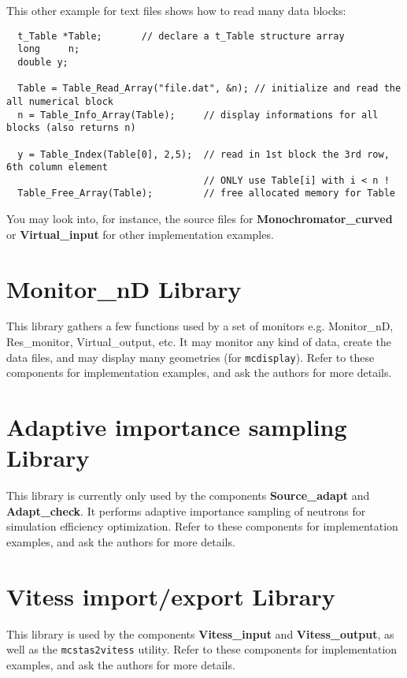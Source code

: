 This other example for text files shows how to read many data blocks:
\begin{verbatim}
  t_Table *Table;       // declare a t_Table structure array
  long     n;
  double y;

  Table = Table_Read_Array("file.dat", &n); // initialize and read the all numerical block
  n = Table_Info_Array(Table);     // display informations for all blocks (also returns n)

  y = Table_Index(Table[0], 2,5);  // read in 1st block the 3rd row, 6th column element
                                   // ONLY use Table[i] with i < n !
  Table_Free_Array(Table);         // free allocated memory for Table
\end{verbatim}

You may look into, for instance, the source files for
{\bf Monochromator\_curved} or {\bf Virtual\_input}
for other implementation examples.

\section{Monitor\_nD Library}

This library gathers a few functions used by a set of monitors e.g. Monitor\_nD, Res\_monitor, Virtual\_output, etc.
It may monitor any kind of data, create the data files, and may display many geometries (for \verb+mcdisplay+).
Refer to these components for implementation examples, and ask the authors for more details.

\section{Adaptive importance sampling Library}

This library is currently only used by the components {\bf Source\_adapt}
and {\bf Adapt\_check}. It performs adaptive importance sampling of neutrons for simulation efficiency optimization.
Refer to these components for implementation examples, and ask the authors for more details.

\section{Vitess import/export Library}

This library is used by the components
{\bf Vitess\_input} and {\bf Vitess\_output},
as well as the \verb+mcstas2vitess+ utility.
Refer to these components for implementation examples, and ask the authors for more details.

